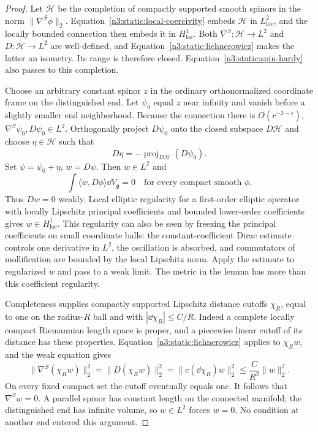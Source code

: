 \begin{proof}
Let \(\mathcal H\) be the completion of compactly supported smooth
spinors in the norm \(\|\nabla^S\phi\|_2\).
Equation~\eqref{n3:static:local-coercivity} embeds \(\mathcal H\)
in \(L^2_{\mathrm{loc}}\), and the locally bounded connection
then embeds it in \(H^1_{\mathrm{loc}}\).
Both \(\nabla^S:\mathcal H\to L^2\) and
\(D:\mathcal H\to L^2\) are well-defined, and
Equation~\eqref{n3:static:lichnerowicz} makes the latter an isometry.
Its range is therefore closed.
Equation~\eqref{n3:static:spin-hardy} also passes to this completion.

Choose an arbitrary constant spinor \(z\) in the ordinary
orthonormalized coordinate frame on the distinguished end.
Let \(\psi_0\) equal \(z\) near infinity and vanish before a
slightly smaller end neighborhood.
Because the connection there is \(O(r^{-2-\epsilon})\),
\(\nabla^S\psi_0,D\psi_0\in L^2\).
Orthogonally project \(D\psi_0\) onto the closed subspace
\(D\mathcal H\) and choose \(\eta\in\mathcal H\) such that
\[
D\eta=-\operatorname{proj}_{D\mathcal H}(D\psi_0).
\]
Set \(\psi=\psi_0+\eta\), \(w=D\psi\).
Then \(w\in L^2\) and
\[
\int\langle w,D\phi\rangle\dd V_{\mathfrak g}=0
\quad\text{for every compact smooth }\phi.
\]
Thus \(Dw=0\) weakly.
Local elliptic regularity for a first-order elliptic operator with
locally Lipschitz principal coefficients and bounded lower-order
coefficients gives \(w\in H^1_{\mathrm{loc}}\).
This regularity can also be seen by freezing the principal
coefficients on small coordinate balls: the constant-coefficient
Dirac estimate controls one derivative in \(L^2\), the oscillation
is absorbed, and commutators of mollification are bounded by the
local Lipschitz norm. Apply the estimate to regularized \(w\)
and pass to a weak limit.
The metric in the lemma has more than this coefficient regularity.

Completeness supplies compactly supported Lipschitz distance cutoffs
\(\chi_R\), equal to one on the radius-\(R\) ball and with
\(|\dd\chi_R|\leq C/R\).
Indeed a complete locally compact Riemannian length space is proper,
and a piecewise linear cutoff of its distance has these properties.
Equation~\eqref{n3:static:lichnerowicz} applies to \(\chi_Rw\), and
the weak equation gives
\[
\|\nabla^S(\chi_Rw)\|_2^2
=\|D(\chi_Rw)\|_2^2
=\|c(\dd\chi_R)w\|_2^2
\leq \frac C{R^2}\|w\|_2^2.
\]
On every fixed compact set the cutoff eventually equals one.
It follows that \(\nabla^S w=0\).
A parallel spinor has constant length on the connected manifold;
the distinguished end has infinite volume, so \(w\in L^2\)
forces \(w=0\).
No condition at another end entered this argument.


\end{proof}
